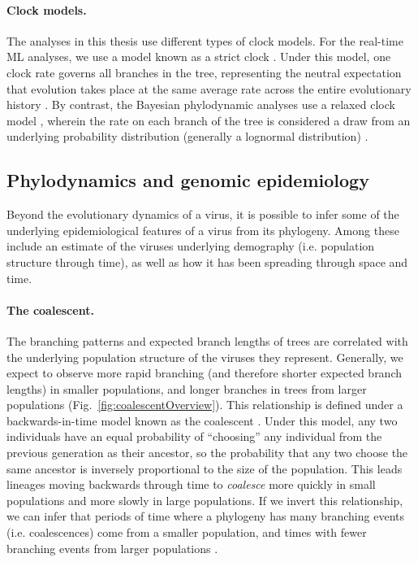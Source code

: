 \paragraph*{Clock models.}
The analyses in this thesis use different types of clock models.
For the real-time ML analyses, we use a model known as a strict clock \citep{brown2011rate}.
Under this model, one clock rate governs all branches in the tree, representing the neutral expectation that evolution takes place at the same average rate across the entire evolutionary history \citep{kimura1968evolutionary}.
By contrast, the Bayesian phylodynamic analyses use a relaxed clock model \citep{brown2011rate}, wherein the rate on each branch of the tree is considered a draw from an underlying probability distribution (generally a lognormal distribution) \citep{drummond2006relaxed}.

\subsection{Phylodynamics and genomic epidemiology}\label{ssec:phylodynamics}
Beyond the evolutionary dynamics of a virus, it is possible to infer some of the underlying epidemiological features of a virus from its phylogeny.
Among these include an estimate of the viruses underlying demography (i.e. population structure through time), as well as how it has been spreading through space and time.

\paragraph*{The coalescent.}
The branching patterns and expected branch lengths of trees are correlated with the underlying population structure of the viruses they represent.
Generally, we expect to observe more rapid branching (and therefore shorter expected branch lengths) in smaller populations, and longer branches in trees from larger populations (Fig.~\ref{fig:coalescentOverview}).
This relationship is defined under a backwards-in-time model known as the coalescent \citep{kingman1982coalescent,kingman1982genealogy}.
Under this model, any two individuals have an equal probability of ``choosing'' any individual from the previous generation as their ancestor, so the probability that any two choose the same ancestor is inversely proportional to the size of the population.
This leads lineages moving backwards through time to \textit{coalesce} more quickly in small populations and more slowly in large populations.
If we invert this relationship, we can infer that periods of time where a phylogeny has many branching events (i.e. coalescences) come from a smaller population, and times with fewer branching events from larger populations \citep{pybus2000integrated,drummond2005bayesian,minin2008smooth,gill2013improving}.

